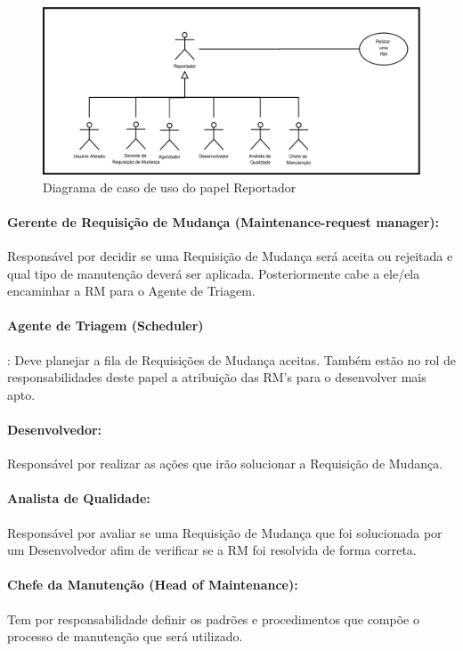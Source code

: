 \begin{figure}[htpb]
	\centering
	\includegraphics[width=0.8\linewidth]{./chapter-manutencao-software-visao-geral/img/diagrama-caso-uso-reportador.pdf}
	\caption{Diagrama de caso de uso do papel Reportador}
	\label{fig:diagrama-caso-uso-reportador}
\end{figure}

\paragraph{Gerente de Requisição de Mudança (Maintenance-request manager):}
Res\-pon\-sá\-vel por decidir se uma Requisição de Mudança será aceita ou
rejeitada e qual tipo de manutenção deverá ser aplicada. Posteriormente cabe a
ele/ela encaminhar a RM para o Agente de Triagem.

\paragraph{Agente de Triagem (Scheduler)}:
Deve planejar a fila de Requisições de Mudança aceitas. Também estão no rol de
responsabilidades deste papel a atribuição das RM's para o desenvolver mais
apto.

\paragraph{Desenvolvedor:}
Responsável por realizar as ações que irão solucionar a Requisição de Mudança.

\paragraph{Analista de Qualidade:}
Responsável por avaliar se uma Requisição de Mudança que foi solucionada por um
Desenvolvedor afim de verificar se a RM foi resolvida de forma correta.

\paragraph{Chefe da Manutenção (Head of	Maintenance):}
Tem por responsabilidade definir os padrões e procedimentos que compõe o
processo de manutenção que será utilizado.

